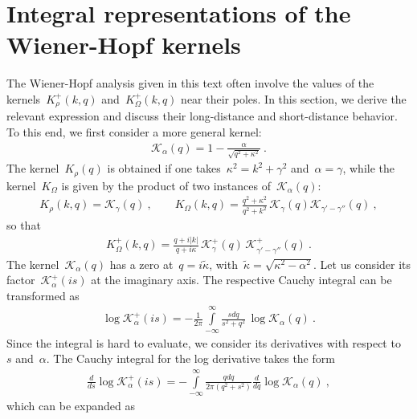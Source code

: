 \documentclass[preprint,aps,eqsecnum, prb]{revtex4-1}
\newcommand{\fplus}[1]{{#1}^{+}}
\begin{document}
\section{Integral representations of the Wiener-Hopf kernels}
\label{sec:app-integrals}

The Wiener-Hopf analysis given in this text often involve the
values of the kernels~$\fplus{K}_\rho(k, q)$ and~$\fplus{K}_\Omega(k, q)$ near
their poles. In this section, we derive the relevant expression
and discuss their long-distance and short-distance behavior.
To this end, we first consider a more general kernel:
\begin{align}
  \mathcal{K}_\alpha(q) = 1 - \frac{\alpha}{\sqrt{q^2 + \kappa^2}}\ .
\end{align}
The kernel~$K_\rho(q)$ is obtained if one takes~$\kappa^2 = k^2 + \gamma^2$
and~$\alpha = \gamma$, while the kernel~$K_\Omega$ is given by
the product of two instances of~$\mathcal{K}_\alpha(q)$:
\begin{align}
  \label{eq:appA-representation}
  K_\rho(k, q) = \mathcal{K}_\gamma(q)\ , \qquad
  K_\Omega(k, q) = \frac{q^2 + \kappa^2}{q^2 + k^2}\,
 \mathcal{K}_{\gamma}(q) \mathcal{K}_{\gamma' - \gamma''}(q)\ ,
\end{align}
so that
\begin{align}
  \fplus{K}_\Omega(k, q) = \frac{q + i|k|}{q + i \kappa}\,
  \fplus{\mathcal{K}}_\gamma(q)\,
  \fplus{\mathcal{K}}_{\gamma' - \gamma''}(q)\ .
\end{align}
The kernel~$\mathcal{K}_\alpha(q)$ has a zero at~$q = i {\tilde \kappa}$,
with~${\tilde \kappa} = \sqrt{\kappa^2 - \alpha^2}$.
Let us consider its factor~$\fplus{\mathcal{K}}_\alpha(is)$
at the imaginary axis.
The respective Cauchy integral can be transformed as
\begin{align}
  \log \fplus{\mathcal{K}}_{\alpha}(is) = - \frac{1}{2\pi}
  \int\limits_{-\infty}^{\infty}
  \frac{s dq}{s^2 + q^2} \, \log \mathcal{K}_{\alpha}(q)\ .
\end{align}
Since the integral is hard to evaluate, we consider its derivatives
with respect to~$s$ and~$\alpha$.
The Cauchy integral for the log derivative takes the form
\begin{align}
  \frac{d}{ds} \log \fplus{\mathcal{K}}_{\alpha}(is)
  = -\int\limits_{-\infty}^{\infty} \frac{qdq}{2\pi (q^2 + s^2)}
  \frac{d}{dq} \log \mathcal{K}_\alpha(q)\ ,
\end{align}
which can be expanded as
\end{document}
